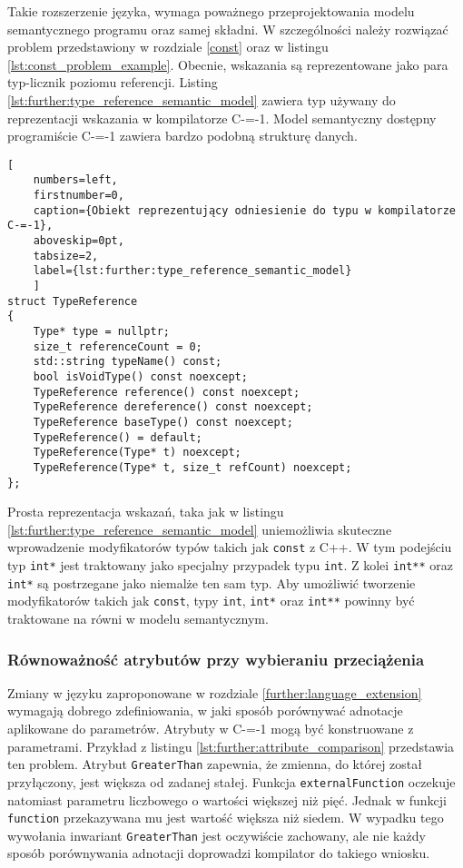 Takie rozszerzenie języka, wymaga poważnego przeprojektowania modelu semantycznego programu oraz samej składni.
W szczególności należy rozwiązać problem przedstawiony w rozdziale \ref{const} oraz w listingu \ref{lst:const_problem_example}.
Obecnie, wskazania są reprezentowane jako para typ-licznik poziomu referencji.
Listing \ref{lst:further:type_reference_semantic_model} zawiera typ używany do reprezentacji wskazania w kompilatorze C-=-1.
Model semantyczny dostępny programiście C-=-1 zawiera bardzo podobną strukturę danych.

\begin{lstlisting}[
	numbers=left,
	firstnumber=0,
	caption={Obiekt reprezentujący odniesienie do typu w kompilatorze C-=-1},
	aboveskip=0pt,
	tabsize=2,
	label={lst:further:type_reference_semantic_model}
	]
struct TypeReference
{
	Type* type = nullptr;
	size_t referenceCount = 0;
	std::string typeName() const;
	bool isVoidType() const noexcept;
	TypeReference reference() const noexcept;
	TypeReference dereference() const noexcept;
	TypeReference baseType() const noexcept;
	TypeReference() = default;
	TypeReference(Type* t) noexcept;
	TypeReference(Type* t, size_t refCount) noexcept;
};
\end{lstlisting}

Prosta reprezentacja wskazań, taka jak w listingu \ref{lst:further:type_reference_semantic_model} uniemożliwia skuteczne wprowadzenie modyfikatorów typów takich jak \lstinline{const} z C++.
W tym podejściu typ \lstinline{int*} jest traktowany jako specjalny przypadek typu \lstinline{int}.
Z kolei \lstinline{int**} oraz \lstinline{int*} są postrzegane jako niemalże ten sam typ.
Aby umożliwić tworzenie modyfikatorów takich jak \lstinline{const}, typy \lstinline{int}, \lstinline{int*} oraz \lstinline{int**} powinny być traktowane na równi w modelu semantycznym.

\subsubsection{Równoważność atrybutów przy wybieraniu przeciążenia}
\label{further:adnotated_type_system:attribute_equivalence}

Zmiany w języku zaproponowane w rozdziale \ref{further:language_extension} wymagają dobrego zdefiniowania, w jaki sposób porównywać adnotacje aplikowane do parametrów.
Atrybuty w C-=-1 mogą być konstruowane z parametrami.
Przykład z listingu \ref{lst:further:attribute_comparison} przedstawia ten problem.
Atrybut \lstinline{GreaterThan} zapewnia, że zmienna, do której został przyłączony, jest większa od zadanej stałej.
Funkcja \lstinline{externalFunction} oczekuje natomiast parametru liczbowego o wartości większej niż pięć.
Jednak w funkcji \lstinline{function} przekazywana mu jest wartość większa niż siedem.
W wypadku tego wywołania inwariant \lstinline{GreaterThan} jest oczywiście zachowany, ale nie każdy sposób porównywania adnotacji doprowadzi kompilator do takiego wniosku.

